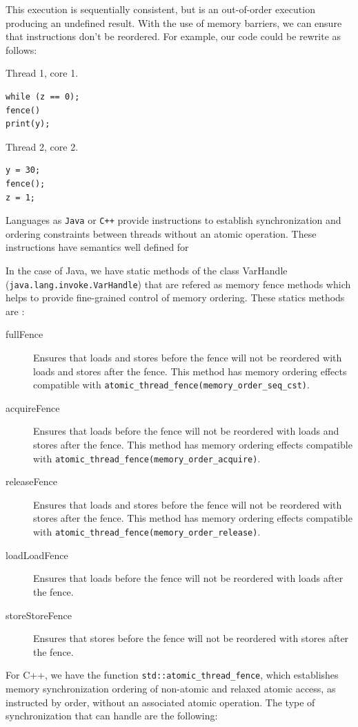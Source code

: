 \documentclass[openany, a4paper]{book}
\theoremstyle{break}
\theoremstyle{example}
\theoremstyle{note}
\theoremstyle{break}
\theoremstyle{exercise}
\begin{document}
This execution is sequentially consistent, but is an out-of-order
execution producing an undefined result. With the use of memory barriers, we
can ensure that instructions don't be reordered. For example, our code could
be rewrite as follows:

Thread 1, core 1.
\begin{verbatim}
while (z == 0);
fence()
print(y);
\end{verbatim}

Thread 2, core 2.
\begin{verbatim}
y = 30;
fence();
z = 1;
\end{verbatim}


Languages as \texttt{Java} or \texttt{C++} provide instructions to establish synchronization
and ordering constraints between threads without an atomic operation. These
instructions have semantics well defined for

In the case of Java, we have static methods of the class VarHandle
(\texttt{java.lang.invoke.VarHandle}) that are refered as memory fence methods which
helps to provide fine-grained control of memory ordering. These statics
methods are \cite{varHandleJdk92017}:

\begin{description}
\item[{fullFence}] Ensures that loads and stores before the fence will not be
reordered with loads and stores after the fence. This method has memory
ordering effects compatible with
\texttt{atomic\_thread\_fence(memory\_order\_seq\_cst)}.
\item[{acquireFence}] Ensures that loads before the fence will not be reordered
with loads and stores after the fence. This method has memory ordering
effects compatible with \texttt{atomic\_thread\_fence(memory\_order\_acquire)}.
\item[{releaseFence}] Ensures that loads and stores before the fence will not
be reordered with stores after the fence. This method has memory ordering
effects compatible with \texttt{atomic\_thread\_fence(memory\_order\_release)}.
\item[{loadLoadFence}] Ensures that loads before the fence will not be
reordered with loads after the fence.
\item[{storeStoreFence}] Ensures that stores before the fence will not be
reordered with stores after the fence.
\end{description}

For C++, we have the function
\texttt{std::atomic\_thread\_fence}\cite{threadFenceCpp2020}, which establishes
memory synchronization ordering of non-atomic and relaxed atomic access, as
instructed by order, without an associated atomic operation. The type of
synchronization that can handle are the following:
\end{document}
